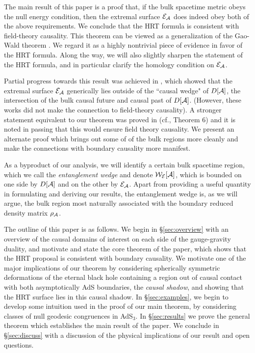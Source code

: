 \documentclass[12pt]{article}
\def\AdS#1{\AdS$_{#1}$}
\def\regA{{\cal A}}
\def\rhoA{{\rho_{\regA}}}
\def\domdA{D[\regA]}
\def\extr{{\cal E}_\regA}
\def\EWA{{\cal W}_{\cal E}[\regA]}
\def\AdS#1{AdS$_{#1}$}
\begin{document}
The main result of this paper is a proof that, if the bulk spacetime metric obeys the null energy condition, then the extremal surface $\extr$ does indeed obey both of the above requirements. We conclude that the HRT formula is consistent with field-theory causality. This theorem can be viewed as a generalization of the Gao-Wald theorem \cite{Gao:2000ga}. We regard it as a highly nontrivial piece of evidence in favor of the HRT formula. Along the way, we will also slightly sharpen the statement of the HRT formula, and in particular clarify the homology condition on $\extr$. 

Partial progress towards this result was achieved in \cite{Hubeny:2012wa, Hubeny:2013gba}, which showed that the extremal surface $\extr$ generically lies outside of the ``causal wedge" of $\domdA$, the intersection of the bulk causal future and causal past of $\domdA$. (However, these works did not make the connection to field-theory causality). A stronger statement equivalent to our theorem was proved in \cite{Wall:2012uf} (cf., Theorem 6) and it is noted in passing that this would ensure field theory causality. We present an alternate proof which brings out some of of the bulk regions more cleanly and make the connections with boundary causality more manifest.

As a byproduct of our analysis, we will identify a certain bulk spacetime region, which we call the \emph{entanglement wedge} and denote $\EWA$, which is bounded on one side by $D[\regA]$ and on the other by $\extr$. Apart from providing a useful quantity in formulating and deriving our results, the entanglement wedge is, as we will argue, the bulk region most naturally associated with the boundary reduced density matrix $\rhoA$.

The outline of this paper is as follows. We begin in \S\ref{sec:overview} with an overview of the causal domains of interest on each side of the gauge-gravity duality, and motivate and state the core theorem of the paper, which shows that the HRT proposal is consistent with boundary causality.  We motivate one of the major implications of our theorem by considering spherically symmetric deformations of the eternal black hole containing a region out of causal contact with both asymptotically AdS boundaries, the \emph{causal shadow}, and showing that the HRT surface lies in this causal shadow. In \S\ref{sec:examples}, we begin to develop some intuition used in the proof of our main theorem, by considering classes of null geodesic congruences in \AdS{3}.  In \S\ref{sec:results} we prove the general theorem which establishes the main result of the paper. We conclude in \S\ref{sec:discuss} with a discussion of the physical implications of our result and open questions.
\end{document}
